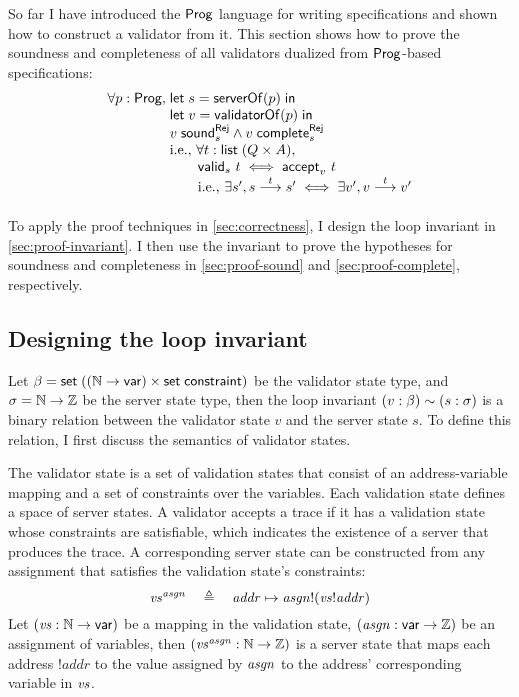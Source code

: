 So far I have introduced the $\mathsf{Prog}$ language for writing specifications and
shown how to construct a validator from it.  This section shows how to prove the
soundness and completeness of all validators dualized from $\mathsf{Prog}$-based
specifications:
\[\begin{array}{r@{\;}l}
\forall p:\Prog,&\letin{s}{\serverOf(p)}\\
&\letin{v}{\validatorOf(p)}\\
&\rejSound v s\wedge\rejComplete v s\\
&\text{i.e., }\forall t:\List(Q\times A),\\
&\qquad\valid s t\iff\accepts v t\\
&\qquad\text{i.e., }\exists s',\behaves s t s'\iff\exists v',\behaves v t v'
\end{array}\]

To apply the proof techniques in \autoref{sec:correctness}, I design the loop
invariant in \autoref{sec:proof-invariant}.  I then use the invariant to prove
the hypotheses for soundness and completeness in \autoref{sec:proof-sound}
and \autoref{sec:proof-complete}, respectively.

\subsection{Designing the loop invariant}
\label{sec:proof-invariant}
Let $\beta=\mathsf{set}\;((\mathbb N\to\mathsf{var})\times\mathsf{set}\;\mathsf{constraint})$ be the validator state
type, and $\sigma=\mathbb N\to\mathbb Z$ be the server state type, then the loop invariant
$(v:\beta)\sim (s:\sigma)$ is a binary relation between the validator
state $v$ and the server state $s$.  To define this relation, I first discuss
the semantics of validator states.

The validator state is a set of validation states that consist of an
address-variable mapping and a set of constraints over the variables.  Each
validation state defines a space of server states.  A validator accepts a trace
if it has a validation state whose constraints are satisfiable, which indicates
the existence of a server that produces the trace.  A corresponding server state
can be constructed from any assignment that satisfies the validation state's
constraints:
\[\mathit{vs}^{\mathit{asgn}}\quad\triangleq\quad \mathit{addr}\mapsto \mathit{asgn}!(\mathit{vs}!\mathit{addr})\]
Let $(\mathit{vs}:\mathbb N\to\mathsf{var})$ be a mapping in the validation state,
$(\mathit{asgn}:\mathsf{var}\to\mathbb Z)$ be an assignment of variables, then
$(\mathit{vs}^{\mathit{asgn}}:\mathbb N\to\mathbb Z)$ is a server state that maps each address
$!\mathit{addr}$ to the value assigned by $\mathit{asgn}$ to the address' corresponding
variable in $\mathit{vs}$.


